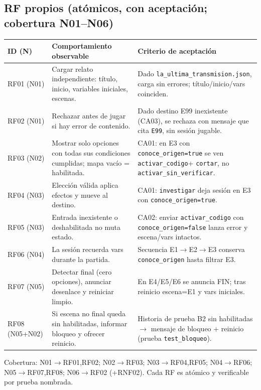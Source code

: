 \documentclass[11pt,a4paper]{article}
\begin{document}
\subsection{RF propios (at\'omicos, con aceptaci\'on; cobertura N01--N06)}
\begin{center}
\small\begin{longtable}{p{1.1cm}p{2.0cm}p{9.5cm}}
\toprule ID (N) & Comportamiento observable & Criterio de aceptaci\'on \\
\midrule
RF01 (N01) & Cargar relato independiente: t\'itulo, inicio, variables iniciales, escenas. & Dado \texttt{la\_ultima\_transmision.json}, carga sin errores; t\'itulo/inicio/vars coinciden. \\
RF02 (N01) & Rechazar antes de jugar si hay error de contenido. & Dado destino E99 inexistente (CA03), se rechaza con mensaje que cita \texttt{E99}, sin sesi\'on jugable. \\
RF03 (N02) & Mostrar solo opciones con todas sus condiciones cumplidas; mapa vac\'io = habilitada. & CA01: en E3 con \texttt{conoce\_origen=true} se ven \texttt{activar\_codigo}+ \texttt{cortar}, no \texttt{activar\_sin\_verificar}. \\
RF04 (N03) & Elecci\'on v\'alida aplica efectos y mueve al destino. & CA01: \texttt{investigar} deja sesi\'on en E3 con \texttt{conoce\_origen=true}. \\
RF05 (N03) & Entrada inexistente o deshabilitada no muta estado. & CA02: enviar \texttt{activar\_codigo} con \texttt{conoce\_origen=false} lanza error y escena/vars intactos. \\
RF06 (N04) & La sesi\'on recuerda vars durante la partida. & Secuencia E1$\to$E2$\to$E3 conserva \texttt{conoce\_origen} hasta filtrar E3. \\
RF07 (N05) & Detectar final (cero opciones), anunciar desenlace y reiniciar limpio. & En E4/E5/E6 se anuncia FIN; tras reinicio escena=E1 y vars iniciales. \\
RF08 (N05+N02) & Si escena no final queda sin habilitadas, informar bloqueo y ofrecer reinicio. & Historia de prueba B2 sin habilitadas $\to$ mensaje de bloqueo + reinicio (prueba \texttt{test\_bloqueo}). \\
\bottomrule
\end{longtable}
\end{center}
Cobertura: N01$\to$RF01,RF02; N02$\to$RF03; N03$\to$RF04,RF05; N04$\to$RF06; N05$\to$RF07,RF08; N06$\to$RF02 (+RNF02). Cada RF es at\'omico y verificable por prueba nombrada.
\end{document}
